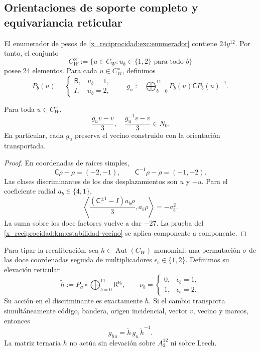 \subsection{Orientaciones de soporte completo y equivariancia reticular}
\label{x_reciprocidad:paper:24-orientaciones}

El enumerador de pesos de \eqref{x_reciprocidad:exc:enumerador} contiene
\(24y^{12}\). Por tanto, el conjunto
\[
 C_W^\times:=
 \{u\in C_W:u_b\in\{1,2\}\text{ para todo }b\}
\]
posee 24 elementos. Para cada \(u\in C_W^\times\), definimos
\[
 P_b(u)=
 \begin{cases}
  \mathsf R,&u_b=1,\\
  I,&u_b=2,
 \end{cases}
 \qquad
 g_u:=\bigoplus_{b=0}^{11}P_b(u)\mathsf C P_b(u)^{-1}.
\]

\begin{proposition}
\label{x_reciprocidad:paper:robustez-orientaciones}
Para toda \(u\in C_W^\times\),
\[
 \frac{g_uv-v}{3},
 \quad
 \frac{g_u^{-1}v-v}{3}
 \in N_0.
\]
En particular, cada \(g_u\) preserva el vecino construido con la
orientación transportada.
\end{proposition}

\begin{proof}
En coordenadas de raíces simples,
\[
 \mathsf C\rho-\rho=(-2,-1),
 \qquad
 \mathsf C^{-1}\rho-\rho=(-1,-2).
\]
Las clases discriminantes de los dos desplazamientos son \(u\) y \(-u\).
Para el coeficiente radial \(a_b\in\{4,1\}\),
\[
 \left\langle
 \frac{(\mathsf C^{\pm1}-I)a_b\rho}{3},a_b\rho
 \right\rangle=-a_b^2.
\]
La suma sobre los doce factores vuelve a dar \(-27\). La prueba del
\cref{x_reciprocidad:km:estabilidad-vecino} se aplica componente a
componente.
\end{proof}

Para tipar la recalibración, sea
\(h\in\operatorname{Aut}(C_W)\) monomial: una permutación \(\sigma\) de
las doce coordenadas seguida de multiplicadores
\(\epsilon_b\in\{1,2\}\). Definimos su elevación reticular
\begin{equation}
 \widetilde h
 :=P_\sigma\circ
 \bigoplus_{b=0}^{11}\mathsf R^{\nu_b},
 \qquad
 \nu_b=
 \begin{cases}
 0,&\epsilon_b=1,\\
 1,&\epsilon_b=2.
 \end{cases}
 \label{x_reciprocidad:paper:elevacion-monomial}
\end{equation}
Su acción en el discriminante es exactamente \(h\). Si el cambio transporta
simultáneamente código, bandera, origen incidencial, vector \(v\), vecino y
marcos, entonces
\begin{equation}
 g_{hu}=\widetilde h\,g_u\,\widetilde h^{-1}.
 \label{x_reciprocidad:paper:naturalidad-isometrias}
\end{equation}
La matriz ternaria \(h\) no actúa sin elevación sobre \(A_2^{12}\) ni sobre
Leech.

